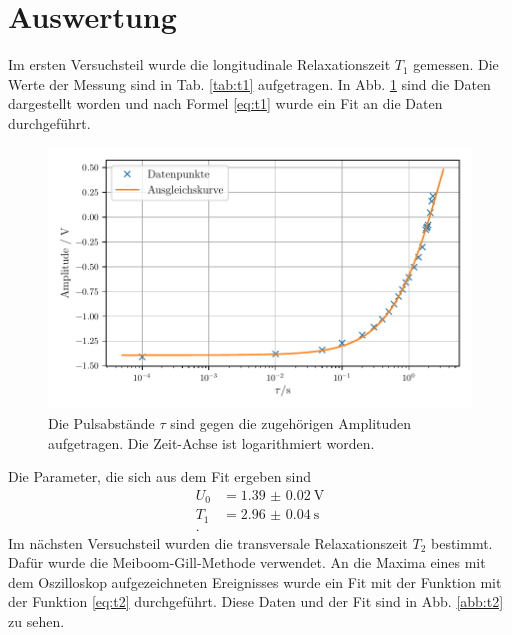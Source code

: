 \section{Auswertung}

Im ersten Versuchsteil wurde die longitudinale Relaxationszeit $T_1$ gemessen. 
Die Werte der Messung sind in Tab. \ref{tab:t1} aufgetragen. 
In Abb. \ref{abb:t1} sind die Daten dargestellt worden und nach Formel \eqref{eq:t1} wurde ein Fit an die Daten durchgeführt.



\begin{figure}
    \centering
    \includegraphics[width=\textwidth]{plots/T1.pdf}
    \caption{Die Pulsabstände $\tau$ sind gegen die zugehörigen Amplituden aufgetragen. Die Zeit-Achse ist logarithmiert worden.}
    \label{abb:t1}
\end{figure}

Die Parameter, die sich aus dem Fit ergeben sind 
\begin{align*}
    U_0 &= \SI{1.39(2)}{\volt} \\
    T_1 &= \SI{2.96(4)}{\second} \\.
\end{align*}
Im nächsten Versuchsteil wurden die transversale Relaxationszeit $T_2$ bestimmt. 
Dafür wurde die Meiboom-Gill-Methode verwendet. An die Maxima eines mit dem Oszilloskop aufgezeichneten Ereignisses wurde ein Fit mit der Funktion mit der Funktion \eqref{eq:t2} durchgeführt. Diese Daten und der Fit sind in Abb. \ref{abb:t2} zu sehen. 

